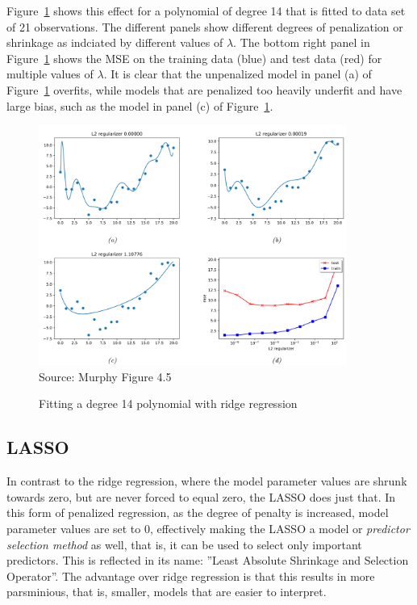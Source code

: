 Figure~\ref{fig:ridgemultiple} shows this effect for a polynomial of degree 14 that is fitted to data set of 21 observations. The different panels show different degrees of penalization or shrinkage as indciated by different values of $\lambda$. The bottom right panel in Figure~\ref{fig:ridgemultiple} shows the MSE on the training data (blue) and test data (red) for multiple values of $\lambda$. It is clear that the unpenalized model in panel (a) of Figure~\ref{fig:ridgemultiple} overfits, while models that are penalized too heavily underfit and have large bias, such as the model in panel (c) of Figure~\ref{fig:ridgemultiple}. 

\begin{figure}
\centering
\includegraphics[width=0.9\textwidth]{screen4.png}\\
\scriptsize Source: Murphy Figure 4.5

\caption{Fitting a degree 14 polynomial with ridge regression}
\label{fig:ridgemultiple}
\end{figure}

\subsection{LASSO}

In contrast to the ridge regression, where the model parameter values are shrunk towards zero, but are never forced to equal zero, the LASSO does just that. In this form of penalized regression, as the degree of penalty is increased, model parameter values are set to 0, effectively making the LASSO a model or \emph{predictor selection method} as well, that is, it can be used to select only important predictors. This is reflected in its name: ''Least Absolute Shrinkage and Selection Operator''. The advantage over ridge regression is that this results in more parsminious, that is, smaller, models that are easier to interpret.

